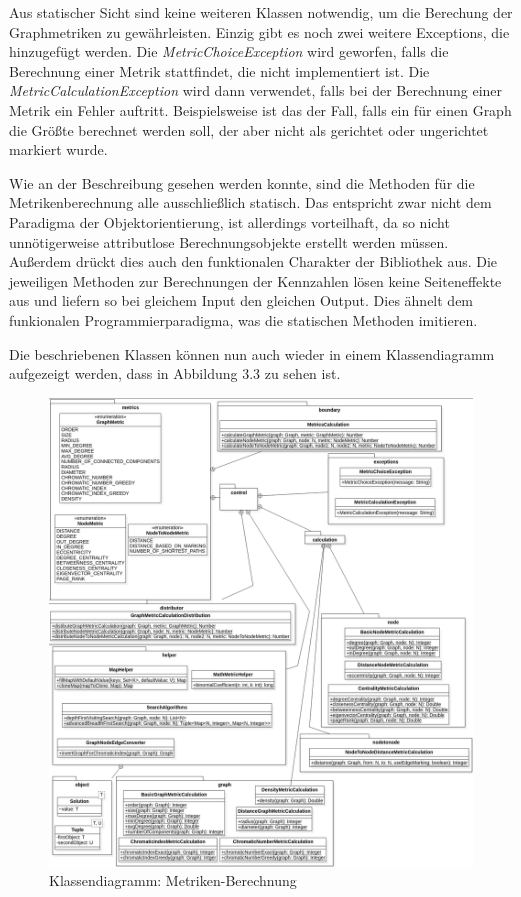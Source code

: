 \documentclass[a4paper,12pt,ngerman,chapterprefix=false,listof=totoc,bibliography=totoc]{scrreprt}
\begin{document}
{{{Aus statischer Sicht sind keine weiteren Klassen notwendig, um die Berechung der Graphmetriken zu gewährleisten. Einzig gibt es noch zwei weitere Exceptions, die hinzugefügt werden. Die \textit{MetricChoiceException} wird geworfen, falls die Berechnung einer Metrik stattfindet, die nicht implementiert ist. Die \textit{MetricCalculationException} wird dann verwendet, falls bei der Berechnung einer Metrik ein Fehler auftritt. Beispielsweise ist das der Fall, falls ein für einen Graph die Größte berechnet werden soll, der aber nicht als gerichtet oder ungerichtet markiert wurde.

Wie an der Beschreibung gesehen werden konnte, sind die Methoden für die Metrikenberechnung alle ausschließlich statisch. Das entspricht zwar nicht dem Paradigma der Objektorientierung, ist allerdings vorteilhaft, da so nicht unnötigerweise attributlose Berechnungsobjekte erstellt werden müssen. Außerdem drückt dies auch den funktionalen Charakter der Bibliothek aus. Die jeweiligen Methoden zur Berechnungen der Kennzahlen lösen keine Seiteneffekte aus und liefern so bei gleichem Input den gleichen Output. Dies ähnelt dem funkionalen Programmierparadigma, was die statischen Methoden imitieren. \cite{chiusano_functional_2015}

Die beschriebenen Klassen können nun auch wieder in einem Klassendiagramm aufgezeigt werden, dass in Abbildung 3.3 zu sehen ist.
\begin{figure}[htp]
	\centering
	\includegraphics[scale=.38]{Abbildungen/UML/metrics_class_diagram.png}
	\caption[Klassendiagramm: Metriken-Berechnung]{Klassendiagramm: Metriken-Berechnung}
\end{figure}
}
}}
\end{document}
